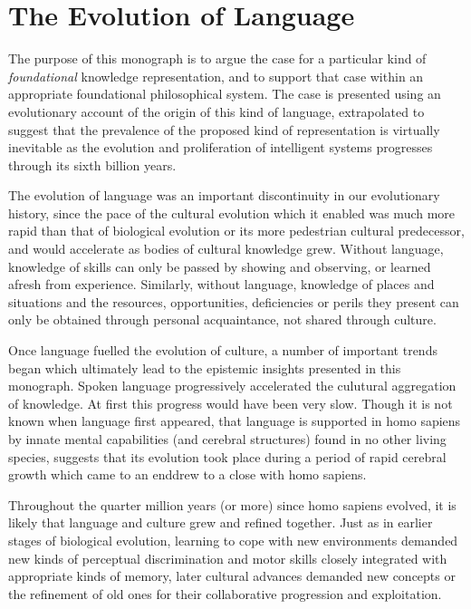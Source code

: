 \section{The Evolution of Language}

The purpose of this monograph is to argue the case for a particular kind of \emph{foundational} knowledge representation, and to support that case within an appropriate foundational philosophical system.
The case is presented using an evolutionary account of the origin of this kind of language, extrapolated to suggest that the prevalence of the proposed kind of representation is virtually inevitable as the evolution and proliferation of intelligent systems progresses through its sixth billion years.

The evolution of language was an important discontinuity in our evolutionary history, since the pace of the cultural evolution which it enabled was much more rapid than that of biological evolution or its more pedestrian cultural predecessor, and would accelerate as bodies of cultural knowledge grew.
  Without language, knowledge of skills can only be passed by showing and observing, or learned afresh from experience.
Similarly, without language, knowledge of places and situations and the resources, opportunities, deficiencies or perils they present can only be obtained through personal acquaintance, not shared through culture.
  
Once language fuelled the evolution of culture, a number of important trends began which ultimately lead to the epistemic insights presented in this monograph.
Spoken language progressively accelerated the culutural aggregation of knowledge.
At first this progress would have been very slow.
Though it is not known when language first appeared, that language is supported in homo sapiens by innate mental capabilities (and cerebral structures) found in no other living species, suggests that its evolution took place during a period of rapid cerebral growth which came to an enddrew to a close with homo sapiens.

Throughout the quarter million years (or more) since homo sapiens evolved, it is likely that language and culture grew and refined together.
Just as in earlier stages of biological evolution, learning to cope with new environments demanded new kinds of perceptual discrimination and motor skills closely integrated with appropriate kinds of memory, later cultural advances demanded new concepts or the refinement of old ones for their collaborative progression and exploitation.

